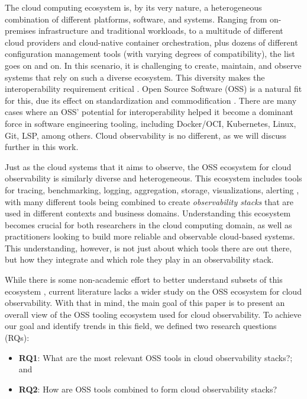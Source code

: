 \documentclass[sigconf]{acmart}
\begin{document}
The cloud computing ecosystem is, by its very nature, a heterogeneous
combination of different platforms, software, and systems. Ranging from
on-premises infrastructure and traditional workloads, to a multitude of
different cloud providers and cloud-native container orchestration, plus
dozens of different configuration management tools (with varying degrees
of compatibility), the list goes on and on. In this scenario, it is
challenging to create, maintain, and observe systems that rely on such a
diverse ecosystem. This diversity makes the interoperability requirement
critical \cite{6133225} \cite{6480040}. Open Source Software
(OSS) is a natural fit for this, due its effect on standardization and
commodification \cite{Linden2009}. There are many cases where an
OSS' potential for interoperability helped it become a dominant force in
software engineering tooling, including Docker/OCI, Kubernetes, Linux,
Git, LSP, among others. Cloud observability is no different, as we will
discuss further in this work.

Just as the cloud systems that it aims to observe, the OSS ecosystem for cloud
observability is similarly diverse and heterogeneous. This ecosystem includes
tools for tracing, benchmarking, logging, aggregation, storage, visualizations,
alerting \cite{beyer2016site}, with many different tools being combined to
create \emph{observability stacks} that are used in different contexts and
business domains. Understanding this ecosystem becomes crucial for both
researchers in the cloud computing domain, as well as practitioners looking
to build more reliable and observable cloud-based systems. This understanding,
however, is not just about which tools there are out there, but how they
integrate and which role they play in an observability stack.

While there is some non-academic effort to better understand subsets of
this ecosystem \cite{cnf-landscape}, current literature lacks a
wider study on the OSS ecosystem for cloud observability. With that in
mind, the main goal of this paper is to present an overall view of the
OSS tooling ecosystem used for cloud observability. To achieve our goal
and identify trends in this field, we defined two research questions
(RQs):

\begin{itemize}
\item
  \textbf{RQ1}: What are the most relevant OSS tools in cloud
  observability stacks?; and
\item
  \textbf{RQ2}: How are OSS tools combined to form cloud observability
  stacks?
\end{itemize}
\end{document}
